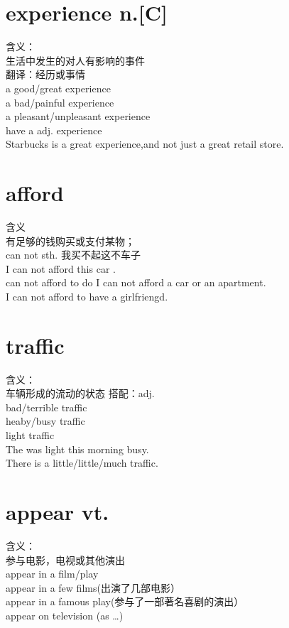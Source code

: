 \documentclass[twocolumn]{ctexbook}
\newcommand{\phrase}[1]{{\colorbox{yellow!40}{#1}}}
\newcommand{\point}[1]{{\color{red}#1}}
\newcommand{\word}[1]{{\em\color{black}{#1}}}
\newcommand{\sentence}[1]{{\colorbox[gray]{0.8}{#1}}}
\begin{document}
	\section{experience n.[C]}
	含义：\\
	生活中发生的对人\point{有影响}的\point{事件}\\
	翻译：\point{经历}或\point{事情}\\
	\phrase{a good/great experience}\\
	\phrase{a bad/painful experience}\\
	\phrase{a pleasant/unpleasant experience}\\
	\point{have a adj. experience}\\
	\sentence{Starbucks is a great experience,and not just a great retail store.}\\
        \section{afford}
        含义\\
        有足够的钱购买或支付某物；\\
        \phrase{\point{can not} \word{afford} sth.}
        我买不起这不车子\\
        I can not afford this car .\\
        \phrase{can not afford to do }
        I can not afford a car \point{or} an apartment.\\
        I can not afford to have a girlfriengd.\\
        \section{traffic}
        含义：\\
        车辆形成的\point{流动的状态}
        搭配：adj.\\
        bad/terrible traffic\\
        heaby/busy traffic\\
        light traffic\\
        The \word{traffic} was \point{light} this morning busy.\\
        \sentence{There is a little/little/much traffic.}\\
        \section{appear vt.}
        含义：\\
        参与\point{电影，电视}或其他\point{演出}\\
        appear in a film/play\\
        appear in a few films(出演了几部电影）\\
        appear in a famous play(参与了一部著名喜剧的演出）\\
        \sentence{appear on television (as \ldots{}})
\end{document}

